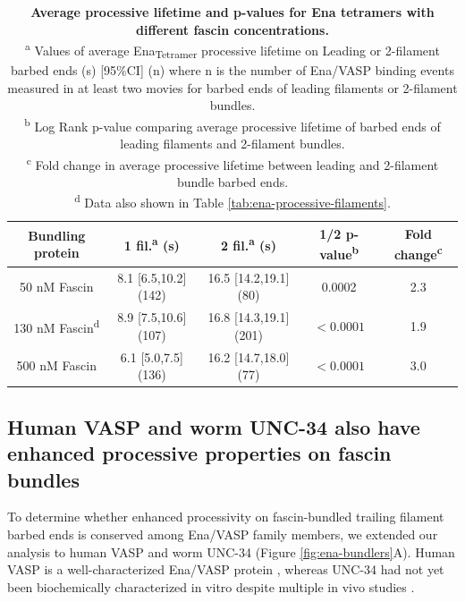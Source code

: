 \begin{table}[!htb]
\centering
\begin{tabular}{c c c c c}
\toprule 
Bundling protein & 1 fil.\textsuperscript{a} (s) & 2 fil.\textsuperscript{a} (s) & 1/2 p-value\textsuperscript{b} & Fold change\textsuperscript{c} \\
\midrule
50 nM Fascin & 8.1 [6.5,10.2] (142) & 16.5 [14.2,19.1] (80) & 0.0002 & 2.3 \\
130 nM Fascin\textsuperscript{d} & 8.9 [7.5,10.6] (107) & 16.8 [14.3,19.1] (201) & $<0.0001$ & 1.9 \\
500 nM Fascin & 6.1 [5.0,7.5] (136) & 16.2 [14.7,18.0] (77) & $<0.0001$ & 3.0 \\
\bottomrule
\end{tabular}
\caption[Average processive lifetime and p-values for Ena tetramers with different fascin concentrations.]{\textbf{Average processive lifetime and p-values for Ena tetramers with different fascin concentrations.} \\
   \textsuperscript{a} Values of average Ena\textsubscript{Tetramer} processive lifetime on Leading or 2-filament barbed ends (s) [95\%CI] (n) where n is the number of Ena/VASP binding events measured in at least two movies for barbed ends of leading filaments or 2-filament bundles.\\
   \textsuperscript{b} Log Rank p-value comparing average processive lifetime of barbed ends of leading filaments and 2-filament bundles. \\
   \textsuperscript{c} Fold change in average processive lifetime between leading and 2-filament bundle barbed ends. \\
   \textsuperscript{d} Data also shown in Table \ref{tab:ena-processive-filaments}.\\
   }
\label{tab:ena-p-fascin-range}
\end{table}

\subsection{Human VASP and worm UNC-34 also have enhanced processive properties on fascin bundles}\label{vasp-unc34-processive}

To determine whether enhanced processivity on fascin-bundled trailing filament barbed ends is conserved among Ena/VASP family members, we extended our analysis to human VASP and worm UNC-34 (Figure \ref{fig:ena-bundlers}A). Human VASP is a well-characterized Ena/VASP protein \citep{bachmann_evh2_1999,chereau_understanding_2006,breitsprecher_clustering_2008,pasic_ena/vasp_2008,hansen_vasp_2010}, whereas UNC-34 had not yet been biochemically characterized in vitro despite multiple in vivo studies \citep{sheffield_c._2007,fleming_role_2010,havrylenko_wave_2015}. 

